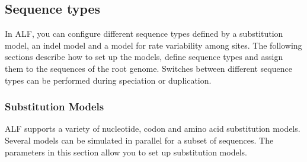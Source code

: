 \documentclass[11pt]{article}
\begin{document}
\subsection{Sequence types}
In ALF, you can configure different sequence types defined by a substitution model, an indel model and a model for rate variability among sites. The following sections describe how to set up the models, define sequence types and assign them to the sequences of the root genome. Switches between different sequence types can be performed during speciation or duplication.
 
\subsubsection{Substitution Models}
\label{sec.substmodels}
ALF supports a variety of nucleotide, codon and amino acid substitution models. Several models can be simulated in parallel for a subset of sequences. The parameters in this section allow you to set up substitution models.
\end{document}
